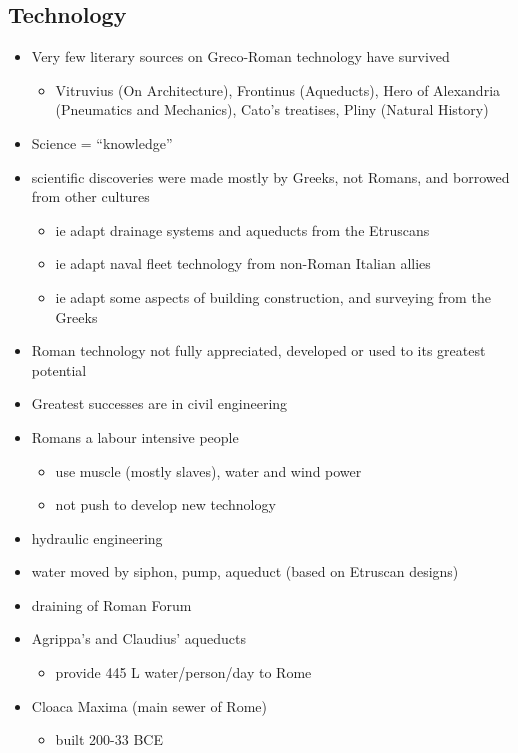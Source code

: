 \documentclass[12pt, twoside]{article}
\begin{document}
\begin{itemize}
\section{Technology}
\begin{itemize}
\item Very few literary sources on Greco-Roman technology have survived
	\begin{itemize}
	\item Vitruvius (On Architecture), Frontinus (Aqueducts), Hero of Alexandria (Pneumatics and Mechanics), Cato's treatises, Pliny (Natural History)
	\end{itemize}
\item Science = “knowledge”
\item scientific discoveries were made mostly by Greeks, not Romans, and borrowed from other cultures
	\begin{itemize}
	\item ie adapt drainage systems and aqueducts from the Etruscans
	\item ie adapt naval fleet technology from non-Roman Italian allies
	\item ie adapt some aspects of building construction, and surveying from the Greeks
	\end{itemize}
\item Roman technology not fully appreciated, developed or used to its greatest potential
\item Greatest successes are in civil engineering
\item Romans a labour intensive people
	\begin{itemize}
	\item use muscle (mostly slaves), water and wind power
	\item not push to develop new technology
	\end{itemize}
\item hydraulic engineering
\item water moved by siphon, pump, aqueduct (based on Etruscan designs)
\item draining of Roman Forum
\item Agrippa's and Claudius' aqueducts
	\begin{itemize}
	\item provide 445 L water/person/day to Rome
	\end{itemize}
\item Cloaca Maxima (main sewer of Rome)
	\begin{itemize}
	\item built 200-33 BCE

\end{itemize}
\end{itemize}
\end{itemize}
\end{document}
